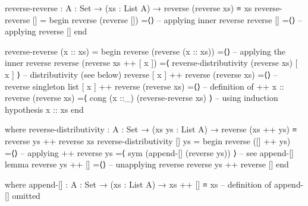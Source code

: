 \documentclass[a4paper,UKenglish]{tufte-handout}
\theoremstyle{definition}
\begin{document}
\begin{fullwidth}
\begin{AgdaAlign}
\begin{AgdaSuppressSpace}
\begin{code}[number]
reverse-reverse : {A : Set} → (xs : List A) → reverse (reverse xs) ≡ xs
reverse-reverse [] =
  begin
    reverse (reverse [])
  =⟨⟩                                             -- applying inner reverse
    reverse []
  =⟨⟩                                             -- applying reverse
    []
  end
\end{code}
\begin{code}[number]
reverse-reverse (x :: xs) =
  begin
    reverse (reverse (x :: xs))
  =⟨⟩                                             -- applying the inner reverse
    reverse (reverse xs ++ [ x ])
  =⟨ reverse-distributivity (reverse xs) [ x ] ⟩  -- distributivity (see below)
    reverse [ x ] ++ reverse (reverse xs)
  =⟨⟩                                             -- reverse singleton list
    [ x ] ++ reverse (reverse xs)
  =⟨⟩                                             -- definition of ++
    x :: reverse (reverse xs)
  =⟨ cong (x ::_) (reverse-reverse xs) ⟩          -- using induction hypothesis
    x :: xs
  end
\end{code}
\begin{code}[number]
  where
    reverse-distributivity : {A : Set} → (xs ys : List A)
                           → reverse (xs ++ ys) ≡ reverse ys ++ reverse xs
    reverse-distributivity [] ys =
      begin
        reverse ([] ++ ys)
      =⟨⟩                                    -- applying ++
        reverse ys
      =⟨ sym (append-[] (reverse ys)) ⟩      -- see append-[] lemma
        reverse ys ++ []
      =⟨⟩                                    -- unapplying reverse
        reverse ys ++ reverse []
      end

      where
        append-[] : {A : Set} → (xs : List A) → xs ++ [] ≡ xs
        -- definition of append-[] omitted


\end{code}
\end{AgdaSuppressSpace}
\end{AgdaAlign}
\end{fullwidth}
\end{document}
